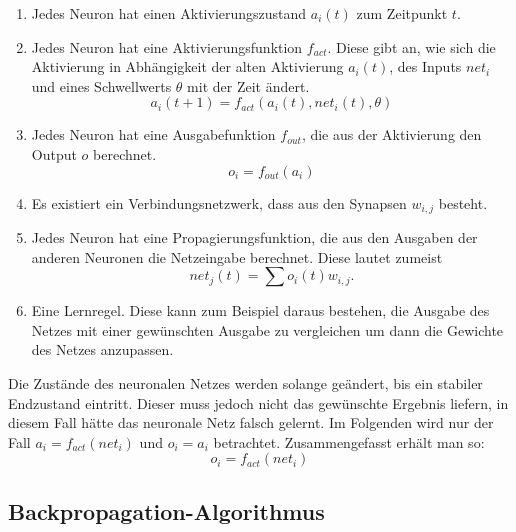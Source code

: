 \documentclass[12pt]{article}
\begin{document}
	\begin{enumerate}
		\item Jedes Neuron hat einen Aktivierungszustand $a_i(t)$ zum Zeitpunkt $t$.
		\item Jedes Neuron hat eine Aktivierungsfunktion $f_{act}$. Diese gibt an, wie sich die Aktivierung in Abhängigkeit der alten Aktivierung $a_i(t)$, des Inputs $net_i$ und eines Schwellwerts $\theta$ mit der Zeit ändert.
\begin{equation}a_i(t+1)=f_{act}(a_i(t),net_i(t),\theta)\end{equation}
		\item Jedes Neuron hat eine Ausgabefunktion $f_{out}$, die aus der Aktivierung den Output $o$ berechnet.
\begin{equation}o_i=f_{out}(a_i)\end{equation}
		\item Es existiert ein Verbindungsnetzwerk, dass aus den Synapsen $w_{i,j}$ besteht.
		\item Jedes Neuron hat eine Propagierungsfunktion, die aus den Ausgaben der anderen Neuronen die Netzeingabe berechnet. Diese lautet zumeist
\begin{equation}net_j(t)=\sum o_i(t)w_{i,j}.\end{equation}
		\item Eine Lernregel. Diese kann zum Beispiel daraus bestehen, die Ausgabe des Netzes mit einer gewünschten Ausgabe zu vergleichen um dann die Gewichte des Netzes anzupassen.
	\end{enumerate}
Die Zustände des neuronalen Netzes werden solange geändert, bis ein stabiler Endzustand eintritt. Dieser muss jedoch nicht das gewünschte Ergebnis liefern, in diesem Fall hätte das neuronale Netz falsch gelernt.\cite{PDP}
Im Folgenden wird nur der Fall $a_i=f_{act}(net_i)$ und $o_i=a_i$ betrachtet. Zusammengefasst erhält man so:
	\begin{equation}
	o_i=f_{act}(net_i)	
	\end{equation}

\subsection{Backpropagation-Algorithmus}
\label{BP}
	
\end{document}
